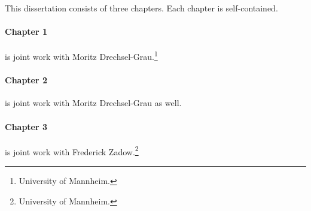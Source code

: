 This dissertation consists of three chapters. Each chapter is self-contained.

\paragraph{Chapter 1} is joint work with Moritz Drechsel-Grau.\footnote{University of Mannheim.}
%

\paragraph{Chapter 2} is joint work with Moritz Drechsel-Grau as well.
%

\paragraph{Chapter 3} is joint work with Frederick Zadow.\footnote{University of Mannheim.}
%



